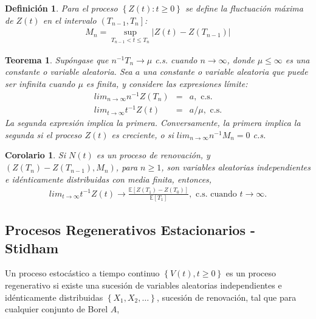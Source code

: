 \documentclass{article}
\newtheorem{Def}{Definición}
\newtheorem{Teo}{Teorema}
\newtheorem{Coro}{Corolario}
\newcommand{\esp}{\mathbb{E}}
\begin{document}
\begin{Def}
Para el proceso $\left\{Z\left(t\right):t\geq0\right\}$ se define la fluctuaci\'on m\'axima de $Z\left(t\right)$ en el intervalo $\left(T_{n-1},T_{n}\right]$:
\begin{eqnarray*}
M_{n}=\sup_{T_{n-1}<t\leq T_{n}}|Z\left(t\right)-Z\left(T_{n-1}\right)|
\end{eqnarray*}
\end{Def}

\begin{Teo}
Sup\'ongase que $n^{-1}T_{n}\rightarrow\mu$ c.s. cuando $n\rightarrow\infty$, donde $\mu\leq\infty$ es una constante o variable aleatoria. Sea $a$ una constante o variable aleatoria que puede ser infinita cuando $\mu$ es finita, y considere las expresiones l\'imite:
\begin{eqnarray}
lim_{n\rightarrow\infty}n^{-1}Z\left(T_{n}\right)&=&a,\textrm{ c.s.}\\
lim_{t\rightarrow\infty}t^{-1}Z\left(t\right)&=&a/\mu,\textrm{ c.s.}
\end{eqnarray}
La segunda expresi\'on implica la primera. Conversamente, la primera implica la segunda si el proceso $Z\left(t\right)$ es creciente, o si $lim_{n\rightarrow\infty}n^{-1}M_{n}=0$ c.s.
\end{Teo}

\begin{Coro}
Si $N\left(t\right)$ es un proceso de renovaci\'on, y $\left(Z\left(T_{n}\right)-Z\left(T_{n-1}\right),M_{n}\right)$, para $n\geq1$, son variables aleatorias independientes e id\'enticamente distribuidas con media finita, entonces,
\begin{eqnarray}
lim_{t\rightarrow\infty}t^{-1}Z\left(t\right)\rightarrow\frac{\esp\left[Z\left(T_{1}\right)-Z\left(T_{0}\right)\right]}{\esp\left[T_{1}\right]},\textrm{ c.s. cuando  }t\rightarrow\infty.
\end{eqnarray}
\end{Coro}




\subsection{Procesos Regenerativos Estacionarios - Stidham \cite{Stidham}}


Un proceso estoc\'astico a tiempo continuo $\left\{V\left(t\right),t\geq0\right\}$ es un proceso regenerativo si existe una sucesi\'on de variables aleatorias independientes e id\'enticamente distribuidas $\left\{X_{1},X_{2},\ldots\right\}$, sucesi\'on de renovaci\'on, tal que para cualquier conjunto de Borel $A$, 
\end{document}
